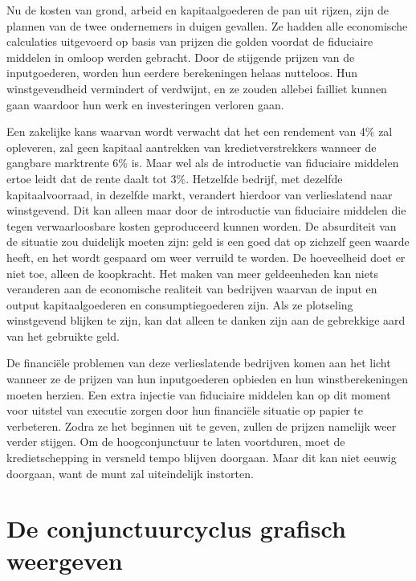 \documentclass[
  a5paper,
  smalldemyvopaper,11pt,twoside,onecolumn,openright,extrafontsizes,
hidelinks]{memoir}
\begin{document}
Nu de kosten van grond, arbeid en kapitaalgoederen de pan uit rijzen,
zijn de plannen van de twee ondernemers in duigen gevallen. Ze hadden
alle economische calculaties uitgevoerd op basis van prijzen die golden
voordat de fiduciaire middelen in omloop werden gebracht. Door de
stijgende prijzen van de inputgoederen, worden hun eerdere berekeningen
helaas nutteloos. Hun winstgevendheid vermindert of verdwijnt, en ze
zouden allebei failliet kunnen gaan waardoor hun werk en investeringen
verloren gaan.

Een zakelijke kans waarvan wordt verwacht dat het een rendement van 4\%
zal opleveren, zal geen kapitaal aantrekken van kredietverstrekkers
wanneer de gangbare marktrente 6\% is. Maar wel als de introductie van
fiduciaire middelen ertoe leidt dat de rente daalt tot 3\%. Hetzelfde
bedrijf, met dezelfde kapitaalvoorraad, in dezelfde markt, verandert
hierdoor van verlieslatend naar winstgevend. Dit kan alleen maar door de
introductie van fiduciaire middelen die tegen verwaarloosbare kosten
geproduceerd kunnen worden. De absurditeit van de situatie zou duidelijk
moeten zijn: geld is een goed dat op zichzelf geen waarde heeft, en het
wordt gespaard om weer verruild te worden. De hoeveelheid doet er niet
toe, alleen de koopkracht. Het maken van meer geldeenheden kan niets
veranderen aan de economische realiteit van bedrijven waarvan de input
en output kapitaalgoederen en consumptiegoederen zijn. Als ze plotseling
winstgevend blijken te zijn, kan dat alleen te danken zijn aan de
gebrekkige aard van het gebruikte geld.

De financiële problemen van deze verlieslatende bedrijven komen aan het
licht wanneer ze de prijzen van hun inputgoederen opbieden en hun
winstberekeningen moeten herzien. Een extra injectie van fiduciaire
middelen kan op dit moment voor uitstel van executie zorgen door hun
financiële situatie op papier te verbeteren. Zodra ze het beginnen uit
te geven, zullen de prijzen namelijk weer verder stijgen. Om de
hoogconjunctuur te laten voortduren, moet de kredietschepping in
versneld tempo blijven doorgaan. Maar dit kan niet eeuwig doorgaan, want
de munt zal uiteindelijk instorten.

\section{De conjunctuurcyclus grafisch
weergeven}\label{de-conjunctuurcyclus-grafisch-weergeven}
\end{document}
